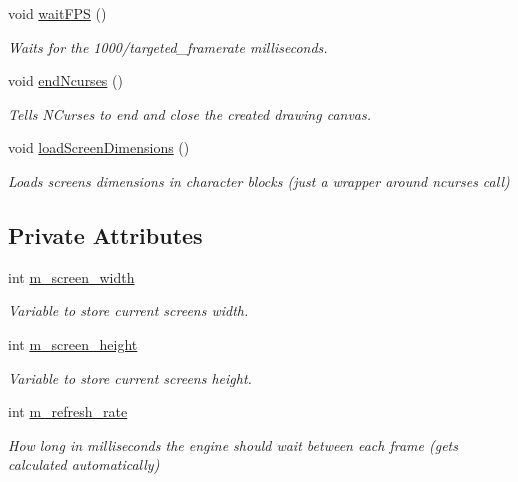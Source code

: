 \begin{DoxyCompactItemize}
void \hyperlink{classEngineWrapper_a3e56de98238ab684cec60aaa556e1e40}{wait\+F\+PS} ()
\begin{DoxyCompactList}\small\item\em Waits for the 1000/targeted\+\_\+framerate milliseconds. \end{DoxyCompactList}\item 
void \hyperlink{classEngineWrapper_ad2e7298e01e58e4ddf4ce34f40b1ef50}{end\+Ncurses} ()
\begin{DoxyCompactList}\small\item\em Tells N\+Curses to end and close the created drawing canvas. \end{DoxyCompactList}\item 
void \hyperlink{classEngineWrapper_a2831a7eb3e2743e72848014314fc7e0e}{load\+Screen\+Dimensions} ()
\begin{DoxyCompactList}\small\item\em Loads screen\textquotesingle{}s dimensions in character blocks (just a wrapper around ncurses call) \end{DoxyCompactList}\end{DoxyCompactItemize}
\subsection*{Private Attributes}
\begin{DoxyCompactItemize}
\item 
int \hyperlink{classEngineWrapper_a53d49d56ab2b6e1ec9d34c2826f09f78}{m\+\_\+screen\+\_\+width}
\begin{DoxyCompactList}\small\item\em Variable to store current screen\textquotesingle{}s width. \end{DoxyCompactList}\item 
int \hyperlink{classEngineWrapper_a493a1f3303ab70c4dc90145e57ea3eaf}{m\+\_\+screen\+\_\+height}
\begin{DoxyCompactList}\small\item\em Variable to store current screen\textquotesingle{}s height. \end{DoxyCompactList}\item 
int \hyperlink{classEngineWrapper_a4a5092ca1f1008be1c49867fc0abd3c8}{m\+\_\+refresh\+\_\+rate}
\begin{DoxyCompactList}\small\item\em How long in milliseconds the engine should wait between each frame (gets calculated automatically) \end{DoxyCompactList}\end{DoxyCompactItemize}


